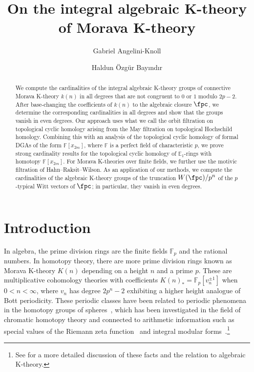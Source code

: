 \documentclass[english,10pt]{amsart}
\date{}
\author{Gabriel Angelini-Knoll}
\author{Haldun {\"O}zg{\"u}r  Bay{\i}nd{\i}r}
\theoremstyle{definition}
\numberwithin{equation}{section}
\begin{document}
\title{On the integral algebraic K-theory of Morava K-theory}


\begin{abstract}
We compute the cardinalities of the integral algebraic K-theory groups of connective Morava K-theory $k(n)$ in all degrees that are not congruent to $0$ or $1$ modulo $2p-2$. After base-changing the coefficients of $k(n)$ to the algebraic closure $\fpc$, we determine the corresponding cardinalities in all degrees and show that the groups vanish in even degrees. Our approach uses  what we call the orbit filtration on topological cyclic homology arising from the May filtration on topological Hochschild homology. Combining this with an analysis of the topological cyclic homology of formal DGAs of the form  $\mathbb{F}[x_{2m}]$, where $\mathbb{F}$ is a perfect field of characteristic $p$, we prove strong cardinality results for the topological cyclic homology of  $\mathbb{E}_1$-rings with homotopy $\mathbb{F}[x_{2m}]$. 
For  Morava K-theories over finite fields, we further use the motivic filtration of Hahn--Raksit--Wilson.
As an application of our methods, we compute the cardinalities of the algebraic K-theory groups of the truncation $W(\fpc)/p^n$ of the $p$-typical Witt vectors of $\fpc$; in particular, they vanish in even degrees. 
\end{abstract}

\maketitle
\setcounter{tocdepth}{1}
\tableofcontents{}

\section{Introduction}
In algebra, the prime division rings are the finite fields $\mathbb{F}_p$ and the rational numbers. In homotopy theory, there are more prime division rings known as Morava K-theory $K(n)$ depending on a height $n$ and a prime $p$. These are multiplicative cohomology theories with coefficients $K(n)_*=\mathbb{F}_p[v_n^{\pm 1}]$ when $0<n<\infty$, where $v_n$ has degree $2p^n-2$ exhibiting a higher height analogue of Bott periodicity. These periodic classes have been related to periodic phenomena in the homotopy groups of spheres~\cite{MRW77}, which has been investigated in the field of chromatic homotopy theory and connected to arithmetic information such as special values of the Riemann zeta function~\cite{Ada66} and integral modular forms~\cite{Beh09}.\footnote{See \cite[pp.~2658--2661]{AK23} for a more detailed discussion of these facts and the relation to algebraic K-theory.} 
\end{document}
